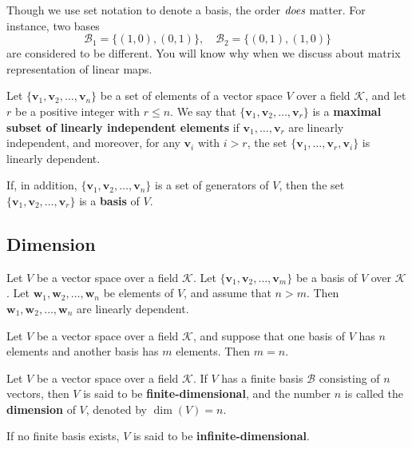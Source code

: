 \documentclass{ctexart}
\begin{document}
	\begin{myrmk}
		Though we use set notation to denote a basis, the order $\emph{does}$ matter. For instance, two bases 
		\[
		\mathcal{B}_1=\{(1,0),(0,1)\},\quad \mathcal{B}_2=\{(0,1),(1,0)\}
		\]
		are considered to be different. You will know why when we discuss about matrix representation of linear maps.
	\end{myrmk}
	
	\begin{mythm}
		Let $\{\mathbf{v}_1, \mathbf{v}_2, \dots, \mathbf{v}_n\}$ be a set of elements of a vector space $V$ over a field $\mathcal{K}$, and let $r$ be a positive integer with $r \leq n$.  
		We say that $\{\mathbf{v}_1, \mathbf{v}_2, \dots, \mathbf{v}_r\}$ is a \textbf{maximal subset of linearly independent elements} if 
		$\mathbf{v}_1, \dots, \mathbf{v}_r$ are linearly independent, and moreover, for any $\mathbf{v}_i$ with $i > r$, the set 
		$\{\mathbf{v}_1, \dots, \mathbf{v}_r, \mathbf{v}_i\}$ is linearly dependent.
		
		If, in addition, $\{\mathbf{v}_1, \mathbf{v}_2, \dots, \mathbf{v}_n\}$ is a set of generators of $V$,  
		then the set $\{\mathbf{v}_1, \mathbf{v}_2, \dots, \mathbf{v}_r\}$ is a \textbf{basis} of $V$.
	\end{mythm}
	
	
	\subsection{Dimension}
	
	\begin{mythm}
		Let $V$ be a vector space over a field $\mathcal{K}$.  
		Let $\{\mathbf{v}_1, \mathbf{v}_2, \dots, \mathbf{v}_m\}$ be a basis of $V$ over $\mathcal{K}$.  
		Let $\mathbf{w}_1, \mathbf{w}_2, \dots, \mathbf{w}_n$ be elements of $V$, and assume that $n > m$.  
		Then $\mathbf{w}_1, \mathbf{w}_2, \dots, \mathbf{w}_n$ are linearly dependent.
	\end{mythm}
	
	\begin{mythm}
		Let $V$ be a vector space over a field $\mathcal{K}$, and suppose that one basis of $V$ has $n$ elements and another basis has $m$ elements.  
		Then $m = n$.
	\end{mythm}
	
	\begin{mydef}
		Let $V$ be a vector space over a field $\mathcal{K}$.  
		If $V$ has a finite basis $\mathcal{B}$ consisting of $n$ vectors, then $V$ is said to be \textbf{finite-dimensional}, and the number $n$ is called the \textbf{dimension} of $V$, denoted by $\dim(V) = n$.
		
		If no finite basis exists, $V$ is said to be \textbf{infinite-dimensional}.
	\end{mydef}
	
\end{document}
